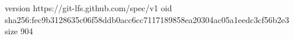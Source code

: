 version https://git-lfs.github.com/spec/v1
oid sha256:fec9b3128635c06f58ddb0acc6cc7117189858ea20304ac05a1eedc3cf56b2e3
size 904
